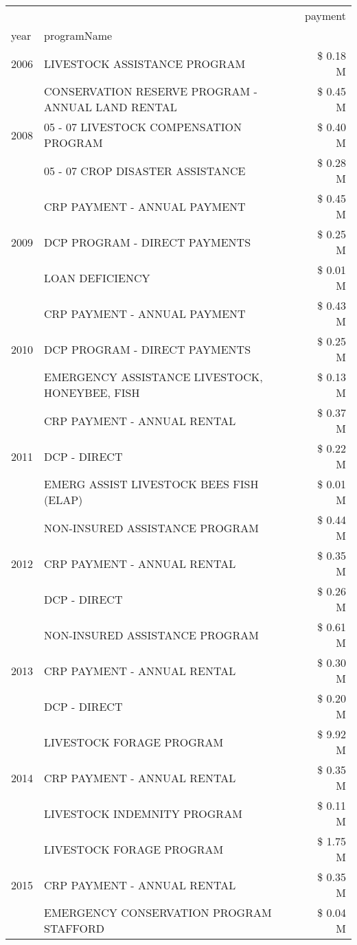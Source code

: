 \begin{tabular}{llr}
\toprule
 &  & payment \\
year & programName &  \\
\midrule
2006 & LIVESTOCK ASSISTANCE PROGRAM & \$ 0.18 M \\
\cline{1-3}
\multirow[t]{3}{*}{2008} & CONSERVATION RESERVE PROGRAM - ANNUAL LAND RENTAL & \$ 0.45 M \\
 & 05 - 07 LIVESTOCK COMPENSATION PROGRAM & \$ 0.40 M \\
 & 05 - 07 CROP DISASTER ASSISTANCE & \$ 0.28 M \\
\cline{1-3}
\multirow[t]{3}{*}{2009} & CRP PAYMENT - ANNUAL PAYMENT & \$ 0.45 M \\
 & DCP PROGRAM - DIRECT PAYMENTS & \$ 0.25 M \\
 & LOAN DEFICIENCY & \$ 0.01 M \\
\cline{1-3}
\multirow[t]{3}{*}{2010} & CRP PAYMENT - ANNUAL PAYMENT & \$ 0.43 M \\
 & DCP PROGRAM - DIRECT PAYMENTS & \$ 0.25 M \\
 & EMERGENCY ASSISTANCE LIVESTOCK, HONEYBEE, FISH & \$ 0.13 M \\
\cline{1-3}
\multirow[t]{3}{*}{2011} & CRP PAYMENT - ANNUAL RENTAL & \$ 0.37 M \\
 & DCP - DIRECT & \$ 0.22 M \\
 & EMERG ASSIST LIVESTOCK BEES FISH (ELAP) & \$ 0.01 M \\
\cline{1-3}
\multirow[t]{3}{*}{2012} & NON-INSURED ASSISTANCE PROGRAM & \$ 0.44 M \\
 & CRP PAYMENT - ANNUAL RENTAL & \$ 0.35 M \\
 & DCP - DIRECT & \$ 0.26 M \\
\cline{1-3}
\multirow[t]{3}{*}{2013} & NON-INSURED ASSISTANCE PROGRAM & \$ 0.61 M \\
 & CRP PAYMENT - ANNUAL RENTAL & \$ 0.30 M \\
 & DCP - DIRECT & \$ 0.20 M \\
\cline{1-3}
\multirow[t]{3}{*}{2014} & LIVESTOCK FORAGE PROGRAM & \$ 9.92 M \\
 & CRP PAYMENT - ANNUAL RENTAL & \$ 0.35 M \\
 & LIVESTOCK INDEMNITY PROGRAM & \$ 0.11 M \\
\cline{1-3}
\multirow[t]{3}{*}{2015} & LIVESTOCK FORAGE PROGRAM & \$ 1.75 M \\
 & CRP PAYMENT - ANNUAL RENTAL & \$ 0.35 M \\
 & EMERGENCY CONSERVATION PROGRAM STAFFORD & \$ 0.04 M \\

\end{tabular}
